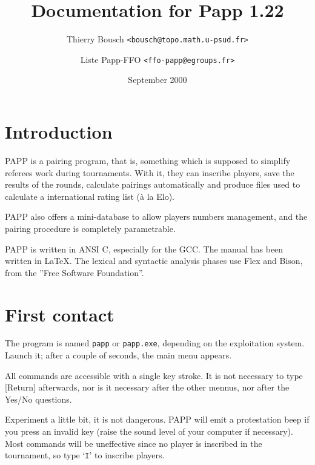 \documentclass[10pt]{article}
\newif\iftth
\begin{document}
\title{\huge\bf Documentation for Papp 1.22}
\author{ {Thierry Bousch {\tt <bousch@topo.math.u-psud.fr>}}
\and {Liste Papp-FFO {\tt <ffo-papp@egroups.fr>}}
}
\date{September 2000}
\maketitle


\iftth   
{\begin{html}<small>If mathematics display oddly in that document,
        change the encoding (MacRoman or ISO-8859-1) in 
        your browser. If this is not enough, you might 
        find a solution there :
        http://hutchinson.belmont.ma.us/tth/manual/</small>
 \end{html}} 
\else {}
\fi    


\section{Introduction}

	PAPP is a pairing program, that is, something which is supposed to 
simplify referees work during tournaments.  With it, they can 
inscribe players, save the results of the rounds, calculate pairings 
automatically and produce files used to calculate a international 
rating list (\`a la Elo).

	PAPP also offers a mini-database to allow players numbers 
management, and the pairing procedure is completely parametrable.

	PAPP is written in ANSI C, especially for the GCC. The manual has 
been written in \LaTeX. The lexical and syntactic analysis phases use 
Flex and Bison, from the ''Free Software Foundation''.

\section{First contact}

	The program is named \verb|papp| or \verb|papp.exe|, depending on the
exploitation system. Launch it; after a couple of seconds, the main 
menu appears.

	All commands are accessible with a single key stroke.  It is not 
necessary to type [Return] afterwards, nor is it necessary after the 
other mennus, nor after the Yes/No questions.

	Experiment a little bit, it is not dangerous.  PAPP will emit a 
protestation beep if you press an invalid key (raise the sound level 
of your computer if necessary). Most commands will be uneffective 
since no player is inscribed in the tournament, so type `\verb|I|' to 
inscribe players.
\end{document}
